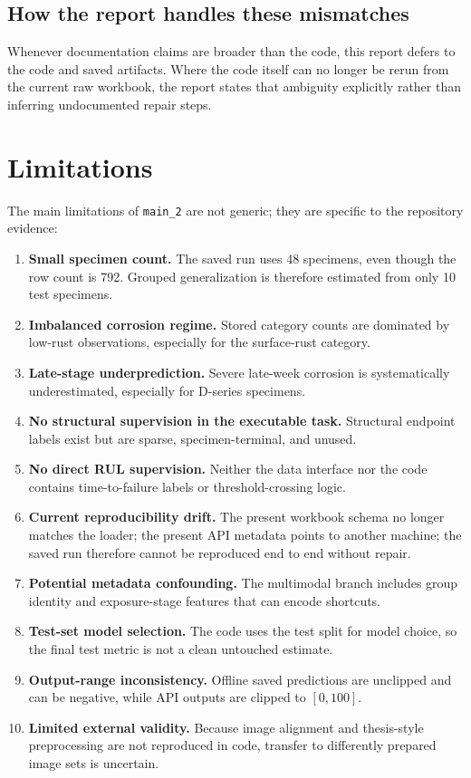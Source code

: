 \documentclass[11pt]{article}
\begin{document}
\subsection{How the report handles these mismatches}
Whenever documentation claims are broader than the code, this report defers to the code and saved artifacts. Where the code itself can no longer be rerun from the current raw workbook, the report states that ambiguity explicitly rather than inferring undocumented repair steps.

\section{Limitations}

The main limitations of \texttt{main\_2} are not generic; they are specific to the repository evidence:
\begin{enumerate}
  \item \textbf{Small specimen count.} The saved run uses 48 specimens, even though the row count is 792. Grouped generalization is therefore estimated from only 10 test specimens.
  \item \textbf{Imbalanced corrosion regime.} Stored category counts are dominated by low-rust observations, especially for the surface-rust category.
  \item \textbf{Late-stage underprediction.} Severe late-week corrosion is systematically underestimated, especially for D-series specimens.
  \item \textbf{No structural supervision in the executable task.} Structural endpoint labels exist but are sparse, specimen-terminal, and unused.
  \item \textbf{No direct RUL supervision.} Neither the data interface nor the code contains time-to-failure labels or threshold-crossing logic.
  \item \textbf{Current reproducibility drift.} The present workbook schema no longer matches the loader; the present API metadata points to another machine; the saved run therefore cannot be reproduced end to end without repair.
  \item \textbf{Potential metadata confounding.} The multimodal branch includes group identity and exposure-stage features that can encode shortcuts.
  \item \textbf{Test-set model selection.} The code uses the test split for model choice, so the final test metric is not a clean untouched estimate.
  \item \textbf{Output-range inconsistency.} Offline saved predictions are unclipped and can be negative, while API outputs are clipped to \([0,100]\).
  \item \textbf{Limited external validity.} Because image alignment and thesis-style preprocessing are not reproduced in code, transfer to differently prepared image sets is uncertain.
\end{enumerate}
\end{document}
